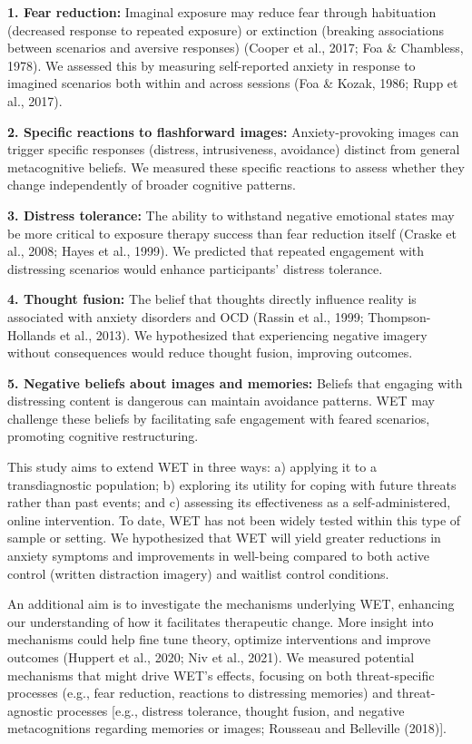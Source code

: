 \documentclass[
  man,floatsintext]{apa7}
\begin{document}
\textbf{1. Fear reduction:} Imaginal exposure may reduce fear through habituation (decreased response to repeated exposure) or extinction (breaking associations between scenarios and aversive responses) (Cooper et al., 2017; Foa \& Chambless, 1978).
We assessed this by measuring self-reported anxiety in response to imagined scenarios both within and across sessions (Foa \& Kozak, 1986; Rupp et al., 2017).

\textbf{2. Specific reactions to flashforward images:} Anxiety-provoking images can trigger specific responses (distress, intrusiveness, avoidance) distinct from general metacognitive beliefs.
We measured these specific reactions to assess whether they change independently of broader cognitive patterns.

\textbf{3. Distress tolerance:} The ability to withstand negative emotional states may be more critical to exposure therapy success than fear reduction itself (Craske et al., 2008; Hayes et al., 1999).
We predicted that repeated engagement with distressing scenarios would enhance participants' distress tolerance.

\textbf{4. Thought fusion:} The belief that thoughts directly influence reality is associated with anxiety disorders and OCD (Rassin et al., 1999; Thompson-Hollands et al., 2013).
We hypothesized that experiencing negative imagery without consequences would reduce thought fusion, improving outcomes.

\textbf{5. Negative beliefs about images and memories:} Beliefs that engaging with distressing content is dangerous can maintain avoidance patterns.
WET may challenge these beliefs by facilitating safe engagement with feared scenarios, promoting cognitive restructuring.

This study aims to extend WET in three ways: a) applying it to a transdiagnostic population; b) exploring its utility for coping with future threats rather than past events; and c) assessing its effectiveness as a self-administered, online intervention.
To date, WET has not been widely tested within this type of sample or setting.
We hypothesized that WET will yield greater reductions in anxiety symptoms and improvements in well-being compared to both active control (written distraction imagery) and waitlist control conditions.

An additional aim is to investigate the mechanisms underlying WET, enhancing our understanding of how it facilitates therapeutic change.
More insight into mechanisms could help fine tune theory, optimize interventions and improve outcomes (Huppert et al., 2020; Niv et al., 2021).
We measured potential mechanisms that might drive WET's effects, focusing on both threat-specific processes (e.g., fear reduction, reactions to distressing memories) and threat-agnostic processes {[}e.g., distress tolerance, thought fusion, and negative metacognitions regarding memories or images; Rousseau and Belleville (2018){]}.
\end{document}
